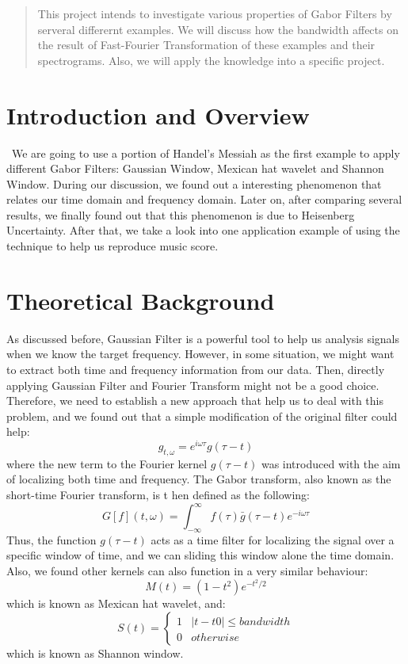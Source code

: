\documentclass[12pt]{article}
\begin{document}
\maketitle

\begin{abstract}
This project intends to investigate various properties of Gabor Filters by serveral differernt examples. We will discuss how the bandwidth affects on the result of Fast-Fourier Transformation of these examples and their spectrograms. Also, we will apply the knowledge into a specific project. 
\end{abstract}

\section{Introduction and Overview}\
	We are going to use a portion of Handel's Messiah as the first example to apply different Gabor Filters: Gaussian Window, Mexican hat wavelet and Shannon Window. During our discussion, we found out a interesting phenomenon that relates our time domain and frequency domain. Later on, after comparing several results, we finally found out that this phenomenon is due to Heisenberg Uncertainty. After that, we take a look into one application example of using the technique to help us reproduce music score.
	
\section{Theoretical Background}
As discussed before, Gaussian Filter is a powerful tool to help us analysis signals when we know the target frequency. However, in some situation, we might want to extract both time and frequency information from our data. Then, directly applying Gaussian Filter and Fourier Transform might not be a good choice. Therefore, we need to establish a new approach that help us to deal with this problem, and we found out that a simple modification of the original filter could help:\\
	\[g_{t,\omega}=e^{i\omega\tau}g(\tau-t)\]
where the new term to the Fourier kernel $g(\tau - t)$ was introduced with the aim of localizing both time and frequency. The Gabor transform, also known as the short-time Fourier transform, is t hen defined as the following:
	\[G[f](t,\omega)=\int_{-\infty}^{\infty}f(\tau)\bar{g}(\tau-t)e^{-i\omega\tau}\]
Thus, the function $g(\tau - t)$ acts as a time filter for localizing the signal over a specific window of time, and we can sliding this window alone the time domain. Also, we found other kernels can also function in a very similar behaviour:
	\[M(t) = (1-t^2)e^{-t^2/2}\]
	which is known as Mexican hat wavelet, and:
	\[ S(t) = \begin{cases} 
      1 & |t - t0|\leq bandwidth \\
      0 & otherwise 
   \end{cases}
\]
which is known as Shannon window.
\end{document}
